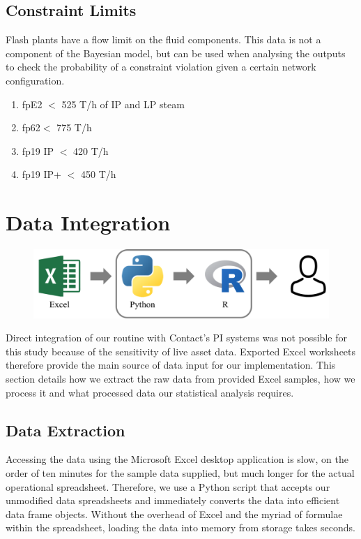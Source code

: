 \documentclass[a4paper, 12pt]{article}
\begin{document}
\subsection{Constraint Limits}
Flash plants have a flow limit on the fluid components. This data is not a component of the Bayesian model, but can be used when analysing the outputs to check the probability of a constraint violation given a certain network configuration.
\begin{enumerate}
\item fpE2 $<$ 525 T/h of IP and LP steam
\item fp62$<$ 775 T/h
\item fp19 IP $<$ 420 T/h
\item fp19 IP+ $<$ 450 T/h 
\end{enumerate}

\section{Data Integration}

\begin{figure}
  \centering
  \includegraphics[width=0.5\linewidth]{media/workflow}
  \label{fig:workflow}
\end{figure}

Direct integration of our routine with Contact's PI systems was not possible for this study because of the sensitivity of live asset data. Exported Excel worksheets therefore provide the main source of data input for our implementation. This section details how we extract the raw data from provided Excel samples, how we process it and what processed data our statistical analysis requires.

\subsection{Data Extraction}
Accessing the data using the Microsoft Excel desktop application is slow, on the order of ten minutes for the sample data supplied, but much longer for the actual operational spreadsheet. Therefore, we use a Python script that accepts our unmodified data spreadsheets and immediately converts the data into efficient data frame objects. Without the overhead of Excel and the myriad of formulae within the spreadsheet, loading the data into memory from storage takes seconds.
\end{document}
